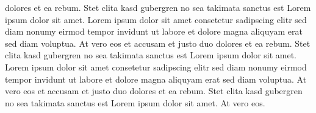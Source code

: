 {dolores et ea rebum. Stet clita kasd gubergren no sea takimata sanctus est Lorem ipsum dolor sit amet. Lorem ipsum dolor sit amet consetetur sadipscing elitr sed diam nonumy eirmod tempor invidunt ut labore et dolore magna aliquyam erat sed diam voluptua. At vero eos et accusam et justo duo dolores et ea rebum. Stet clita kasd gubergren no sea takimata sanctus est Lorem ipsum dolor sit amet. Lorem ipsum dolor sit amet consetetur sadipscing elitr sed diam nonumy eirmod tempor invidunt ut labore et dolore magna aliquyam erat sed diam voluptua. At vero eos et accusam et justo duo dolores et ea rebum. Stet clita kasd gubergren no sea takimata sanctus est Lorem ipsum dolor sit amet. At vero eos.
}


